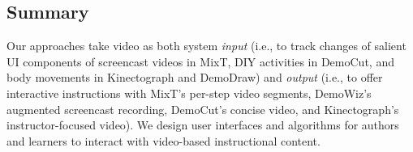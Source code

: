 \subsection{Summary}
Our approaches take video as both system \emph{input} (i.e., to track changes of salient UI components of screencast videos in MixT, DIY activities in DemoCut, and body movements in Kinectograph and DemoDraw) and \emph{output} (i.e., to offer interactive instructions with MixT's per-step video segments, DemoWiz's augmented screencast recording, DemoCut's concise video, and Kinectograph's instructor-focused video). We design user interfaces and algorithms for authors and learners to interact with video-based instructional content.
